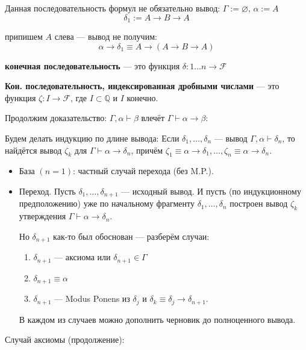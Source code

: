 Данная последовательность формул не обязательно вывод: $\Gamma:=\varnothing$, $\alpha := A$
$$\delta_1 := A\rightarrow B\rightarrow A$$

припишем $A$ слева --- вывод не получим:
$$\alpha\rightarrow\delta_1 \equiv A \rightarrow (A\rightarrow B\rightarrow A)$$




 \textbf{конечная последовательность}
 --- это функция $\delta: 1\dots n \rightarrow \mathcal{F}$


 \textbf{Кон. последовательность, индексированная дробными числами} --- это
функция $\zeta: I \rightarrow \mathcal{F}$, где $I \subset \mathbb{Q}$ и $I$ конечно.

Продолжим доказательство: $\Gamma,\alpha\vdash\beta$ влечёт $\Gamma\vdash\alpha\rightarrow\beta$:

Будем делать индукцию по длине вывода: Если $\delta_1, \dots, \delta_n$ --- вывод
$\Gamma,\alpha\vdash\delta_n$, то найдётся вывод $\zeta_k$ для $\Gamma\vdash\alpha\rightarrow\delta_n$,
причём $\zeta_1 \equiv \alpha\rightarrow\delta_1, \dots, \zeta_n \equiv \alpha\rightarrow\delta_n$.

\begin{itemize}
\item База $(n=1)$: частный случай перехода (без M.P.).

\item Переход. Пусть $\delta_1, \dots, \delta_{n+1}$ --- исходный вывод. И пусть (по индукционному предположению)
уже по начальному фрагменту $\delta_1, \dots, \delta_n$ построен вывод $\zeta_k$ утверждения 
$\Gamma\vdash\alpha\rightarrow\delta_n$. 

Но $\delta_{n+1}$ как-то был обоснован --- разберём случаи:
\begin{enumerate}
\item $\delta_{n+1}$ --- аксиома или $\delta_{n+1} \in \Gamma$ 
\item $\delta_{n+1}\equiv\alpha$
\item $\delta_{n+1}$ --- Modus Ponens из $\delta_j$ и 
$\delta_k \equiv \delta_j\rightarrow\delta_{n+1}$.
\end{enumerate}

В каждом из случаев можно дополнить черновик до полноценного вывода.
\end{itemize}


Случай аксиомы (продолжение):

